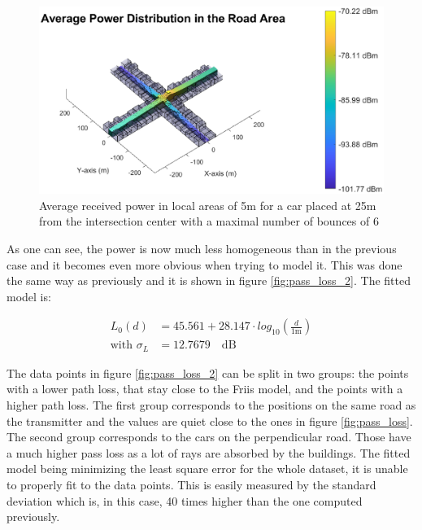 \documentclass[10pt,a4paper]{ULBreport}
\begin{document}
\begin{figure}
    \centering
    \includegraphics[width=1\textwidth]{6_1.eps}
    \caption{Average received power in local areas of 5m for a car placed at 25m from the intersection center with a maximal number of bounces of 6}
    \label{fig:3D_2}
\end{figure}

As one can see, the power is now much less homogeneous than in the previous case and it becomes even more obvious when trying to model it. This was done the same way as previously and it is shown in figure \ref{fig:pass_loss_2}. The fitted model is:

\begin{align*}
    L_0(d) &= 45.561 + 28.147 \cdot log_{10} \left(\frac{d}{1\text{m}}\right)\\
    \text{with } \sigma_L &= 12.7679 \quad \text{dB}
\end{align*}

The data points in figure \ref{fig:pass_loss_2} can be split in two groups: the points with a lower path loss, that stay close to the Friis model, and the points with a higher path loss. The first group corresponds to the positions on the same road as the transmitter and the values are quiet close to the ones in figure \ref{fig:pass_loss}. \\
The second group corresponds to the cars on the perpendicular road. Those have a much higher pass loss as a lot of rays are absorbed by the buildings. The fitted model being minimizing the least square error for the whole dataset, it is unable to properly fit to the data points. This is easily measured by the standard deviation which is, in this case, 40 times higher than the one computed previously. \\
\end{document}
